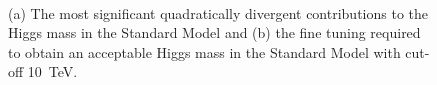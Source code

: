 \begin{figure}[htb!]
 \centering
{}\\[1ex]
\caption{(a) The most significant quadratically divergent contributions to the Higgs mass in the Standard Model and (b) the fine tuning required to obtain an acceptable Higgs mass in the Standard Model with cut-off 10~TeV.}
\label{fig:SMHiggsDivergentContributions}
\end{figure}

